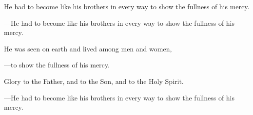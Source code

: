 \responsory

\begin{hangpar}
He had to become like his brothers in every way to show the fullness of his mercy.

{\color{red}---\thinspace }He had to become like his brothers in every way to show the fullness of his mercy.

\medskip He was seen on earth and lived among men and women,

{\color{red}---\thinspace }to show the fullness of his mercy.

\medskip Glory to the Father, and to the Son, and to the Holy Spirit.

{\color{red}---\thinspace }He had to become like his brothers in every way to show the fullness of his mercy.
\end{hangpar}